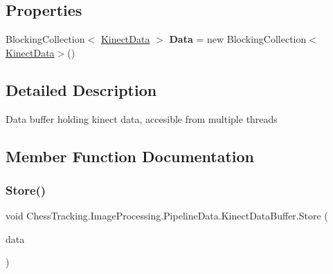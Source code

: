 \subsection*{Properties}
\begin{DoxyCompactItemize}
\item 
\mbox{\label{class_chess_tracking_1_1_image_processing_1_1_pipeline_data_1_1_kinect_data_buffer_ab8d097230a4483316c35db4255c23424}} 
Blocking\+Collection$<$ \mbox{\hyperlink{class_chess_tracking_1_1_image_processing_1_1_pipeline_data_1_1_kinect_data}{Kinect\+Data}} $>$ {\bfseries Data} = new Blocking\+Collection$<$\mbox{\hyperlink{class_chess_tracking_1_1_image_processing_1_1_pipeline_data_1_1_kinect_data}{Kinect\+Data}}$>$()
\end{DoxyCompactItemize}


\subsection{Detailed Description}
Data buffer holding kinect data, accesible from multiple threads 



\subsection{Member Function Documentation}
\mbox{\label{class_chess_tracking_1_1_image_processing_1_1_pipeline_data_1_1_kinect_data_buffer_a9744c849f88289fb5ec180f9ec99a9f3}} 
\subsubsection{\texorpdfstring{Store()}{Store()}}
{\footnotesize\ttfamily void Chess\+Tracking.\+Image\+Processing.\+Pipeline\+Data.\+Kinect\+Data\+Buffer.\+Store (\begin{DoxyParamCaption}\item[{\mbox{\hyperlink{class_chess_tracking_1_1_image_processing_1_1_pipeline_data_1_1_kinect_data}{Kinect\+Data}}}]{data }\end{DoxyParamCaption})}



